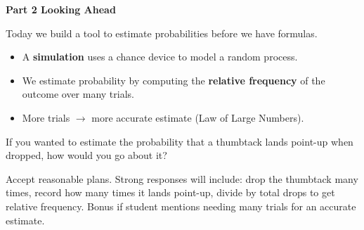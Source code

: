 \documentclass[10pt]{article}
\begin{document}
{\large\bfseries\color{navy} Part 2 \quad Looking Ahead}

\vspace{0.12in}

\noindent Today we build a tool to estimate probabilities before we have formulas.

\vspace{0.14in}

\begin{tcolorbox}[colback=greenbg, colframe=greenacc, boxrule=0.8pt, arc=2mm,
    left=4mm, right=4mm, top=3mm, bottom=3mm]
    \small
    \begin{itemize}[leftmargin=1.3em, itemsep=8pt]
  \item A \textbf{simulation} uses a chance device to model a random process.
  \item We estimate probability by computing the \textbf{relative frequency} of the outcome over many trials.
  \item More trials $\to$ more accurate estimate (Law of Large Numbers).
    \end{itemize}
\end{tcolorbox}

\vspace{0.2in}

\noindent\textcolor{slate}{\small If you wanted to estimate the probability that a thumbtack
lands point-up when dropped, how would you go about it?}\\[8pt]
\begin{teachernote}
Accept reasonable plans. Strong responses will include: drop the thumbtack many times, record how many times it lands point-up, divide by total drops to get relative frequency. Bonus if student mentions needing many trials for an accurate estimate.
\end{teachernote}
\end{document}
